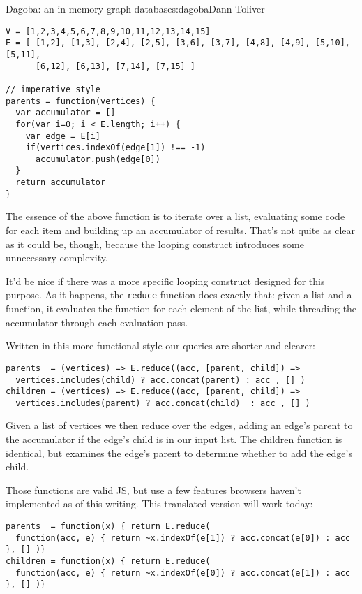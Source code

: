 \begin{aosachapter}{Dagoba: an in-memory graph database}{s:dagoba}{Dann Toliver}
\begin{verbatim}
V = [1,2,3,4,5,6,7,8,9,10,11,12,13,14,15]
E = [ [1,2], [1,3], [2,4], [2,5], [3,6], [3,7], [4,8], [4,9], [5,10], [5,11], 
      [6,12], [6,13], [7,14], [7,15] ]

// imperative style
parents = function(vertices) {
  var accumulator = []
  for(var i=0; i < E.length; i++) {
    var edge = E[i]
    if(vertices.indexOf(edge[1]) !== -1)
      accumulator.push(edge[0])
  }
  return accumulator
}
\end{verbatim}

The essence of the above function is to iterate over a list, evaluating
some code for each item and building up an accumulator of results.
That's not quite as clear as it could be, though, because the looping
construct introduces some unnecessary complexity.

It'd be nice if there was a more specific looping construct designed for
this purpose. As it happens, the \texttt{reduce} function does exactly
that: given a list and a function, it evaluates the function for each
element of the list, while threading the accumulator through each
evaluation pass.

Written in this more functional style our queries are shorter and
clearer:

\begin{verbatim}
parents  = (vertices) => E.reduce((acc, [parent, child]) => 
  vertices.includes(child) ? acc.concat(parent) : acc , [] )
children = (vertices) => E.reduce((acc, [parent, child]) => 
  vertices.includes(parent) ? acc.concat(child)  : acc , [] )
\end{verbatim}

Given a list of vertices we then reduce over the edges, adding an edge's
parent to the accumulator if the edge's child is in our input list. The
children function is identical, but examines the edge's parent to
determine whether to add the edge's child.

Those functions are valid JS, but use a few features browsers haven't
implemented as of this writing. This translated version will work today:

\begin{verbatim}
parents  = function(x) { return E.reduce( 
  function(acc, e) { return ~x.indexOf(e[1]) ? acc.concat(e[0]) : acc }, [] )}
children = function(x) { return E.reduce( 
  function(acc, e) { return ~x.indexOf(e[0]) ? acc.concat(e[1]) : acc }, [] )}
\end{verbatim}


\end{aosachapter}
